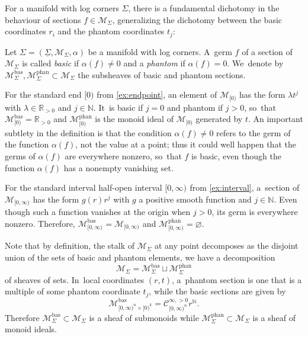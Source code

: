 \documentclass[JEP,XML,SOM,Unicode,NoFloatCountersInSection,published]{cedram}
\theoremstyle{definition}
\theoremstyle{remark}
\newenvironment{example}
  {\pushQED{\qed}\renewcommand{\qedsymbol}{$\lozenge$}\examplex}
  {\popQED\endexamplex}
\let\defn\emph
\newcommand{\RR}{\mathbb{R}}
\newcommand{\NN}{\mathbb{N}}
\newcommand{\model}[2]{\halfspc{#1}\times[0)^{#2}}
\newcommand{\halfspc}[1]{[0,\infty)^{#1}}
\newcommand{\cM}{\mathscr{M}}
\newcommand{\cMbas}{\mathscr{M}^{\mathrm{bas}}}
\newcommand{\cMphan}{\mathscr{M}^{\mathrm{phan}}}
\newcommand{\Cinfpos}[1]{\mathscr{C}^{\infty, > 0}_{#1}}
\newcommand{\Sig}{\Sigma}
\newcommand{\uSig}{\underline{\Sigma}}
\begin{document}
For a manifold with log corners $\Sig$, there is a fundamental dichotomy in the behaviour of sections $f \in \cM_{\Sig}$, generalizing the dichotomy between the basic coordinates $r_i$ and the phantom coordinates $t_j$:

\begin{definition}
Let $\Sig=(\uSig,\cM_\Sig,\alpha)$ be a manifold with log corners. A~germ $f$ of a section of $\cM_\Sig$ is called \defn{basic} if $\alpha(f)\neq 0$ and a \defn{phantom} if $\alpha(f)=0$. We~denote by $\cMbas_\Sig,\cMphan_\Sig \subset \cM_\Sig$ the subsheaves of basic and phantom sections.
\end{definition}

\begin{example}
For the standard end $[0)$ from \autoref{ex:endpoint}, an element of $\cM_{[0)}$ has the form $\lambda t^j$ with $\lambda\in\RR_{>0}$ and $j\in\NN$. It~is basic if $j=0$ and phantom if $j>0$, so~that $\cMbas_{[0)}=\RR_{>0}$ and $\cMphan_{[0)}$ is the monoid ideal of $\cM_{[0)}$ generated by $t$.
\end{example}
An important subtlety in the definition is that the condition $\alpha(f) \neq 0$ refers to the germ of the function $\alpha(f)$, not the value at a point; thus it could well happen that the germs of $\alpha(f)$ are everywhere nonzero, so~that $f$ is basic, even though the function $\alpha(f)$ has a nonempty vanishing set.

\begin{example}
For the standard interval half-open interval $\halfspc{}$ from \autoref{ex:interval}, a~section of $\cM_{\halfspc{}}$ has the form $g(r)r^j$ with $g$ a positive smooth function and $j\in\NN$. Even though such a function vanishes at the origin when $j>0$, its germ is everywhere nonzero. Therefore, $\cMbas_{\halfspc{}}=\cM_{\halfspc{}}$ and $\cMphan_{\halfspc{}}=\varnothing$.
\end{example}

Note that by definition, the stalk of $\cM_\Sig$ at any point decomposes as the disjoint union of the sets of basic and phantom elements, \ie we have a decomposition
\[
\cM_\Sig = \cMbas_\Sig \sqcup \cMphan_\Sig
\]
of sheaves of sets. In~local coordinates $(r,t)$, a~phantom section is one that is a multiple of some phantom coordinate $t_j$, while the basic sections are given by
\[
\cMbas_{\model{n}{k}} = \Cinfpos{\halfspc{n}}r^\NN.
\]
Therefore $\cMbas_\Sig\subset \cM_\Sig$ is a sheaf of submonoids while $\cMphan_\Sig\subset \cM_\Sig$ is a sheaf of monoid ideals.
\end{document}

